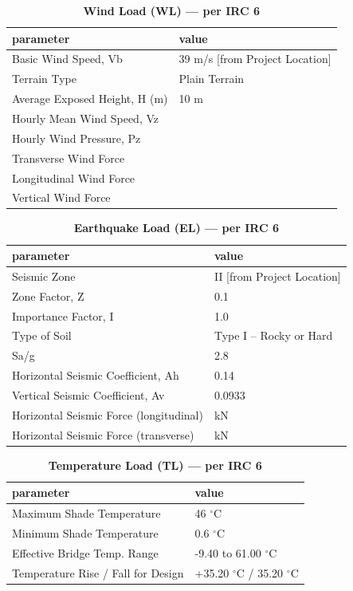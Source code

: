 \documentclass[12pt,a4paper]{report}
\numberwithin{table}{chapter}
\numberwithin{figure}{chapter}
\begin{document}
\vspace{1em}
\begin{longtable}{|L{5.5cm}|p{10.0cm}|}
\caption{\textbf{Wind Load (WL) --- per IRC 6}}
\hline
\textbf{parameter} & \textbf{value} \\
\hline
\textnormal{Basic Wind Speed, Vb} & 39 m/s [from Project Location] \\[6pt]
\hline
\textnormal{Terrain Type} & Plain Terrain \\[6pt]
\hline
\textnormal{Average Exposed Height, H (m)} & 10 m \\[6pt]
\hline
\textnormal{Hourly Mean Wind Speed, Vz} &  \\[6pt]
\hline
\textnormal{Hourly Wind Pressure, Pz} &  \\[6pt]
\hline
\textnormal{Transverse Wind Force} &  \\[6pt]
\hline
\textnormal{Longitudinal Wind Force} &  \\[6pt]
\hline
\textnormal{Vertical Wind Force} &  \\[6pt]
\hline
\end{longtable}

\vspace{1em}
\begin{longtable}{|L{5.5cm}|p{10.0cm}|}
\caption{\textbf{Earthquake Load (EL) --- per IRC 6}}
\hline
\textbf{parameter} & \textbf{value} \\
\hline
\textnormal{Seismic Zone} & II [from Project Location] \\[6pt]
\hline
\textnormal{Zone Factor, Z} & 0.1 \\[6pt]
\hline
\textnormal{Importance Factor, I} & 1.0 \\[6pt]
\hline
\textnormal{Type of Soil} & Type I – Rocky or Hard \\[6pt]
\hline
\textnormal{Sa/g} & 2.8 \\[6pt]
\hline
\textnormal{Horizontal Seismic Coefficient, Ah} & 0.14 \\[6pt]
\hline
\textnormal{Vertical Seismic Coefficient, Av} & 0.0933 \\[6pt]
\hline
\textnormal{Horizontal Seismic Force (longitudinal)} &  kN \\[6pt]
\hline
\textnormal{Horizontal Seismic Force (transverse)} &  kN \\[6pt]
\hline
\end{longtable}

\vspace{1em}
\begin{longtable}{|L{5.5cm}|p{10.0cm}|}
\caption{\textbf{Temperature Load (TL) --- per IRC 6}}
\hline
\textbf{parameter} & \textbf{value} \\
\hline
\textnormal{Maximum Shade Temperature} & 46 $^\circ$C \\[6pt]
\hline
\textnormal{Minimum Shade Temperature} & 0.6 $^\circ$C \\[6pt]
\hline
\textnormal{Effective Bridge Temp. Range} & -9.40 to 61.00 $^\circ$C \\[6pt]
\hline
\textnormal{Temperature Rise / Fall for Design} & +35.20 $^\circ$C / \textminus{}35.20 $^\circ$C \\[6pt]
\hline
\end{longtable}
\end{document}
